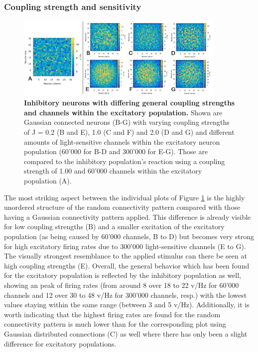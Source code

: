 \documentclass[14pt]{SelfArx} %
\numberwithin{equation}{section}
\begin{document}
\subsubsection{Coupling strength and sensitivity}
\begin{figure} [htb]
\centering
\includegraphics[width = 0.9\textwidth]{in_60300.png}
\caption{\textbf{Inhibitory neurons with differing general coupling strengths and channels within the excitatory population.} Shown are Gaussian connected neurons (B-G) with varying coupling strengths of J = 0.2 (B and E), 1.0 (C and F) and 2.0 (D and G) and different amounts of light-sensitive channels within the excitatory neuron population (60'000 for B-D and 300'000 for E-G). Those are compared to the inhibitory population's reaction using a coupling strength of 1.00 and 60'000 channels within the excitatory population (A).}
\label{fig:in60300}
\end{figure}
The most striking aspect between the individual plots of Figure \ref{fig:in60300} is the highly unordered structure of the random connectivity pattern compared with those having a Gaussian connectivity pattern applied. This difference is already visible for low coupling strengths (B) and a smaller excitation of the excitatory population (as being caused by 60'000 channels, B to D) but becomes very strong for high excitatory firing rates due to 300'000 light-sensitive channels (E to G). The visually strongest resemblance to the applied stimulus can there be seen at high coupling strengths (E). \newline
Overall, the general behavior which has been found for the excitatory population is reflected by the inhibitory population as well, showing an peak of firing rates (from around 8 over 18 to 22 v/Hz for 60'000 channels and 12 over 30 to 48 v/Hz for 300'000 channels, resp.) with the lowest values staying within the same range (between 3 and 5 v/Hz).\newline
Additionally, it is worth indicating that the highest firing rates are found for the random connectivity pattern is much lower than for the corresponding plot using Gaussian distributed connections (C) as well where there has only been a slight difference for excitatory populations. 
\end{document}
